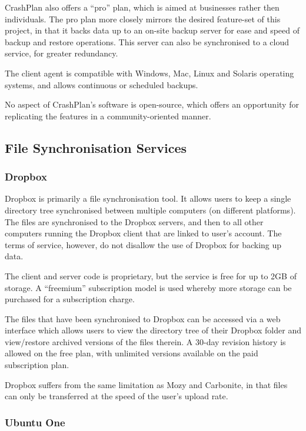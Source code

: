 \begin{bibunit}[plain]
CrashPlan also offers a ``pro'' plan, which is aimed at businesses rather then
individuals. The pro plan more closely mirrors the desired feature-set of this
project, in that it backs data up to an on-site backup server for ease and
speed of backup and restore operations. This server can also be synchronised to
a cloud service, for greater redundancy.

The client agent is compatible with Windows, Mac, Linux and Solaris operating
systems, and allows continuous or scheduled backups.

No aspect of CrashPlan's software is open-source, which offers an opportunity
for replicating the features in a community-oriented manner.

\subsection{File Synchronisation Services}

\subsubsection{Dropbox}

Dropbox is primarily a file synchronisation tool. It allows users to keep
a single directory tree synchronised between multiple computers (on different
platforms). The files are synchronised to the Dropbox servers, and then to all
other computers running the Dropbox client that are linked to user's
account\cite{Dropbox}.  The terms of service, however, do not disallow the use
of Dropbox for backing up data\cite{Dropbox-terms}.

The client and server code is proprietary, but the service is free for up to
2GB of storage. A ``freemium'' subscription model is used whereby more storage
can be purchased for a subscription charge\cite{Dropbox}.

The files that have been synchronised to Dropbox can be accessed via a web
interface which allows users to view the directory tree of their Dropbox folder
and view/restore archived versions of the files therein. A 30-day revision
history is allowed on the free plan, with unlimited versions available on the
paid subscription plan\cite{Dropbox}.

Dropbox suffers from the same limitation as Mozy and Carbonite, in that files
can only be transferred at the speed of the user's upload rate.

\subsubsection{Ubuntu One}


\end{bibunit}
